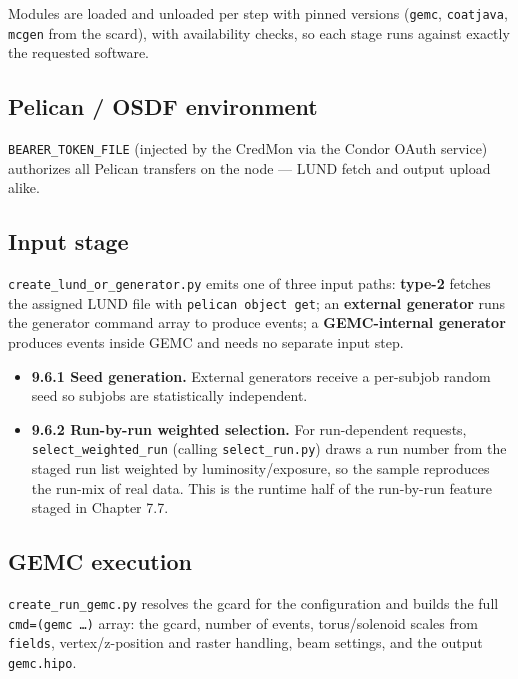 Modules are loaded and unloaded per step with pinned versions (\texttt{gemc}, \texttt{coatjava}, \texttt{mcgen}
from the scard), with availability checks, so each stage runs against exactly the requested software.

\subsection{Pelican / OSDF environment}

\texttt{BEARER\_\allowbreak{}TOKEN\_\allowbreak{}FILE} (injected by the CredMon via the Condor OAuth service)
authorizes all Pelican transfers on the node --- LUND fetch and output upload alike.

\subsection{Input stage}

\texttt{create\_\allowbreak{}lund\_\allowbreak{}or\_\allowbreak{}generator.\allowbreak{}py} emits one of three
input paths: \textbf{type-2} fetches the assigned LUND file with \texttt{pelican object get}; an
\textbf{external generator} runs the generator command array to produce events; a \textbf{GEMC-internal
generator} produces events inside GEMC and needs no separate input step.

\begin{itemize}
  \item \textbf{9.6.1 Seed generation.} External generators receive a per-subjob random seed so subjobs are
  statistically independent.
  \item \textbf{9.6.2 Run-by-run weighted selection.} For run-dependent requests,
  \texttt{select\_\allowbreak{}weighted\_\allowbreak{}run} (calling
  \texttt{select\_\allowbreak{}run.\allowbreak{}py}) draws a run number from the staged run list weighted by
  luminosity/exposure, so the sample reproduces the run-mix of real data. This is the runtime half of the
  run-by-run feature staged in Chapter 7.7.
\end{itemize}

\subsection{GEMC execution}

\texttt{create\_\allowbreak{}run\_\allowbreak{}gemc.\allowbreak{}py} resolves the gcard for the configuration
and builds the full \texttt{cmd=\allowbreak{}(gemc \ldots{})} array: the gcard, number of events,
torus/solenoid scales from \texttt{fields}, vertex/z-position and raster handling, beam settings, and the
output \texttt{gemc.\allowbreak{}hipo}.

